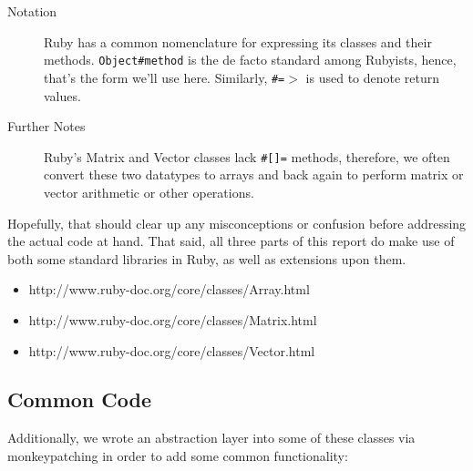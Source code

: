 \documentclass[letterpaper,11pt]{article}
\begin{document}
\begin{description}
\item[Notation]

  Ruby has a common nomenclature for expressing its classes and their methods.
  \texttt{Object\#method} is the de facto standard among Rubyists, hence, that's the form
  we'll use here.
  Similarly, \texttt{\#=$>$} is used to denote return values.

\item[Further Notes]

  Ruby's Matrix and Vector classes lack \texttt{\#[]=} methods, therefore, we often convert
  these two datatypes to arrays and back again to perform matrix or vector arithmetic
  or other operations.

\end{description}

Hopefully, that should clear up any misconceptions or confusion before addressing the actual
code at hand.
That said, all three parts of this report do make use of both some standard libraries in Ruby,
as well as extensions upon them.

\begin{itemize}

\item http://www.ruby-doc.org/core/classes/Array.html
\item http://www.ruby-doc.org/core/classes/Matrix.html
\item http://www.ruby-doc.org/core/classes/Vector.html

\end{itemize}

\subsection{Common Code}

Additionally, we wrote an abstraction layer into some of these classes via monkeypatching in order
to add some common functionality:
\end{document}
